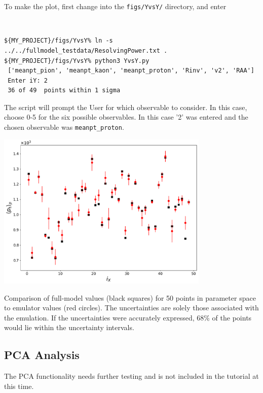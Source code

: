 \documentclass[UserManual.tex]{subfiles}
\begin{document}
To make the plot, first change into the {\tt figs/YvsY/} directory, and enter
{\tt
\begin{verbatim}
${MY_PROJECT}/figs/YvsY% ln -s ../../fullmodel_testdata/ResolvingPower.txt .
${MY_PROJECT}/figs/YvsY% python3 YvsY.py
 ['meanpt_pion', 'meanpt_kaon', 'meanpt_proton', 'Rinv', 'v2', 'RAA']
 Enter iY: 2
 36 of 49  points within 1 sigma
\end{verbatim}}
The script will prompt the User for which observable to consider. In this case, choose 0-5 for the six possible observables. In this case '2' was entered and the chosen observable was {\tt meanpt\_proton}. 
\parbox{4.5in}{\centerline{\includegraphics[width=4.0in]{YvsY_rhic.pdf}}}
\parbox{2.25in}{Comparison of full-model values (black squares) for 50 points in parameter space to emulator values (red circles). The uncertainties are solely those associated with the emulation. If the uncertainties were accurately expressed, 68\% of the points would lie within the uncertainty intervals.}

\subsection{PCA Analysis}
The PCA functionality needs further testing and is not included in the tutorial at this time.
\end{document}
